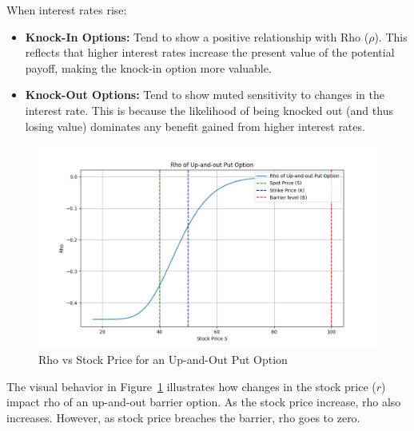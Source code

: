 When interest rates rise:
\begin{itemize}
	\item \textbf{Knock-In Options:} Tend to show a positive relationship with Rho (\(\rho\)). This reflects that higher interest rates increase the present value of the potential payoff, making the knock-in option more valuable.
	\item \textbf{Knock-Out Options:} Tend to show muted sensitivity to changes in the interest rate. This is because the likelihood of being knocked out (and thus losing value) dominates any benefit gained from higher interest rates.
\end{itemize}
\begin{figure}[H]
	\centering
	\includegraphics[width=.65\linewidth]{content/images/rho_upout.png}
	\caption{Rho vs Stock Price for an Up-and-Out Put Option}
	\label{fig:rho_behavior}
\end{figure}

The visual behavior in Figure~\ref{fig:rho_behavior} illustrates how changes in the stock price (\(r\)) impact rho of an up-and-out barrier option. As the stock price increase, rho also increases. However, as stock price breaches the barrier, rho goes to zero.